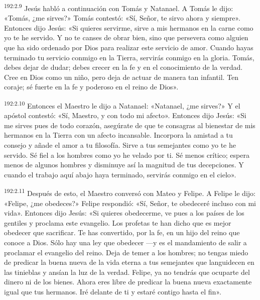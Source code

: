 \par 
\textsuperscript{192:2.9} Jesús habló a continuación con Tomás y Natanael. A Tomás le dijo: «Tomás, ¿me sirves?» Tomás contestó: «Sí, Señor, te sirvo ahora y siempre». Entonces dijo Jesús: «Si quieres servirme, sirve a mis hermanos en la carne como yo te he servido. Y no te canses de obrar bien, sino que persevera como alguien que ha sido ordenado por Dios para realizar este servicio de amor. Cuando hayas terminado tu servicio conmigo en la Tierra, servirás conmigo en la gloria. Tomás, debes dejar de dudar; debes crecer en la fe y en el conocimiento de la verdad. Cree en Dios como un niño, pero deja de actuar de manera tan infantil. Ten coraje; sé fuerte en la fe y poderoso en el reino de Dios».

\par 
\textsuperscript{192:2.10} Entonces el Maestro le dijo a Natanael: «Natanael, ¿me sirves?» Y el apóstol contestó: «Sí, Maestro, y con todo mi afecto». Entonces dijo Jesús: «Si me sirves pues de todo corazón, asegúrate de que te consagras al bienestar de mis hermanos en la Tierra con un afecto incansable. Incorpora la amistad a tu consejo y añade el amor a tu filosofía. Sirve a tus semejantes como yo te he servido. Sé fiel a los hombres como yo he velado por ti. Sé menos crítico; espera menos de algunos hombres y disminuye así la magnitud de tus decepciones. Y cuando el trabajo aquí abajo haya terminado, servirás conmigo en el cielo».

\par 
\textsuperscript{192:2.11} Después de esto, el Maestro conversó con Mateo y Felipe. A Felipe le dijo: «Felipe, ¿me obedeces?» Felipe respondió: «Sí, Señor, te obedeceré incluso con mi vida». Entonces dijo Jesús: «Si quieres obedecerme, ve pues a los países de los gentiles y proclama este evangelio. Los profetas te han dicho que es mejor obedecer que sacrificar. Te has convertido, por la fe, en un hijo del reino que conoce a Dios. Sólo hay una ley que obedecer ---y es el mandamiento de salir a proclamar el evangelio del reino. Deja de temer a los hombres; no tengas miedo de predicar la buena nueva de la vida eterna a tus semejantes que languidecen en las tinieblas y ansían la luz de la verdad. Felipe, ya no tendrás que ocuparte del dinero ni de los bienes. Ahora eres libre de predicar la buena nueva exactamente igual que tus hermanos. Iré delante de ti y estaré contigo hasta el fin».

